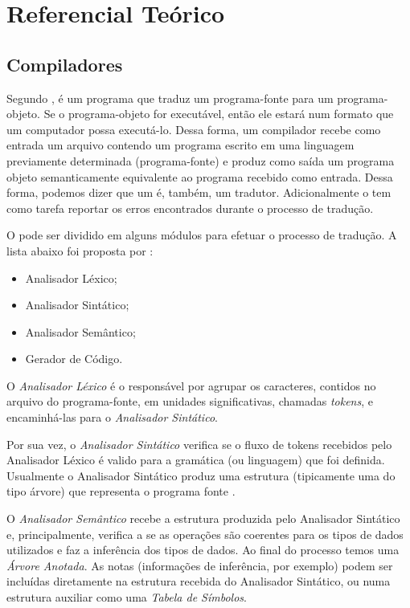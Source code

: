 \section{Referencial Teórico}
\subsection{Compiladores}
Segundo , \compilador{} é um programa que traduz um
programa-fonte para um programa-objeto. Se o programa-objeto for executável,
então ele estará num formato que um computador possa executá-lo. Dessa forma, um compilador recebe
como entrada um arquivo contendo um programa escrito em uma linguagem previamente
determinada (programa-fonte) e produz como saída um programa objeto semanticamente equivalente
ao programa recebido como entrada. Dessa forma, podemos dizer que um \compilador é,
também, um tradutor. Adicionalmente o \compilador tem como tarefa reportar os
erros encontrados durante o processo de tradução.

O \compilador pode ser dividido em alguns módulos para efetuar o processo de
tradução. A lista abaixo foi proposta por :

\begin{itemize}
	\item Analisador Léxico;
	\item Analisador Sintático;
	\item Analisador Semântico;
	\item Gerador de Código.
\end{itemize}

O \emph{Analisador Léxico} é o responsável por agrupar os caracteres, contidos
no arquivo do programa-fonte, em unidades significativas, chamadas
\emph{tokens}, e encaminhá-las para o \emph{Analisador Sintático}.

Por sua vez, o \emph{Analisador Sintático} verifica se o fluxo de tokens
recebidos pelo Analisador Léxico é valido para a gramática (ou linguagem) que
foi definida. Usualmente o Analisador Sintático produz uma estrutura
(tipicamente uma do tipo árvore) que representa o programa fonte
\cite{new-dragon-pt}.

O \emph{Analisador Semântico} recebe a estrutura produzida pelo Analisador
Sintático e, principalmente, verifica a se as operações são coerentes para os
tipos de dados utilizados e faz a inferência dos tipos de dados. Ao final do
processo temos uma \emph{Árvore Anotada}. As notas (informações de inferência,
por exemplo) podem ser incluídas diretamente na estrutura recebida do
Analisador Sintático, ou numa estrutura auxiliar como uma \emph{Tabela de
Símbolos}.

